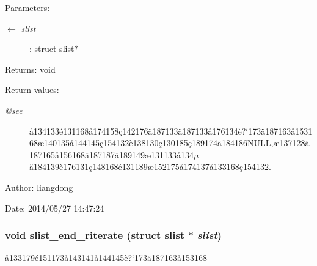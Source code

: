 \begin{Desc}
\item[Parameters:]
\begin{description}
\item[\mbox{$\leftarrow$} {\em slist}]: struct slist$\ast$ \end{description}
\end{Desc}
\begin{Desc}
\item[Returns:]void \end{Desc}
\begin{Desc}
\item[Return values:]
\begin{description}
\item[{\em @see}]\aa{}134133\'{e}131168\aa{}174158\c{c}142176\"{a}187133\"{a}187133\aa{}176134\`{e}?`173\"{a}187163\aa{}153168\ae{}140135\aa{}144145\c{c}154132\`{e}138130\c{c}130185\c{c}189174\"{a}184186NULL,\ae{}137128\"{a}187165\aa{}156168\"{a}187187\"{a}189149\ae{}131133\aa{}134$\mu$\"{a}184139\`{e}176131\c{c}148168\'{e}131189\ae{}152175\aa{}174137\aa{}133168\c{c}154132. \end{description}
\end{Desc}
\begin{Desc}
\item[Author:]liangdong \end{Desc}
\begin{Desc}
\item[Date:]2014/05/27 14:47:24 \end{Desc}
\subsubsection{\setlength{\rightskip}{0pt plus 5cm}void slist\_\-end\_\-riterate (struct slist $\ast$ {\em slist})}\label{slist_8c_a22}


\aa{}133179\'{e}151173\aa{}143141\aa{}144145\`{e}?`173\"{a}187163\aa{}153168 

